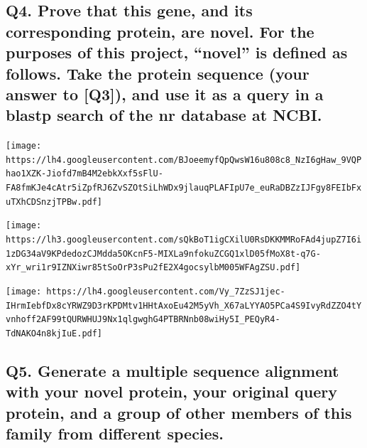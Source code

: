 \documentclass[
  letterpaper,
  DIV=11,
  numbers=noendperiod]{scrartcl}
\begin{document}
\hypertarget{q4.-prove-that-this-gene-and-its-corresponding-protein-are-novel.-for-the-purposes-of-this-project-novel-is-defined-as-follows.-take-the-protein-sequence-your-answer-to-q3-and-use-it-as-a-query-in-a-blastp-search-of-the-nr-database-at-ncbi.}{%
\subsection{\texorpdfstring{Q4. \textbf{Prove that this gene, and its
corresponding protein, are novel. For the purposes of this project,
``novel'' is defined as follows. Take the protein sequence (your answer
to {[}Q3{]}), and use it as a query in a blastp search of the nr
database at
NCBI.}}{Q4. Prove that this gene, and its corresponding protein, are novel. For the purposes of this project, ``novel'' is defined as follows. Take the protein sequence (your answer to {[}Q3{]}), and use it as a query in a blastp search of the nr database at NCBI.}}\label{q4.-prove-that-this-gene-and-its-corresponding-protein-are-novel.-for-the-purposes-of-this-project-novel-is-defined-as-follows.-take-the-protein-sequence-your-answer-to-q3-and-use-it-as-a-query-in-a-blastp-search-of-the-nr-database-at-ncbi.}}

\texttt{[image: https://lh4.googleusercontent.com/BJoeemyfQpQwsW16u808c8\_NzI6gHaw\_9VQPhao1XZK-Jiofd7mB4M2ebkXxf5sFlU-FA8fmKJe4cAtr5iZpfRJ6ZvSZOtSiLhWDx9jlauqPLAFIpU7e\_euRaDBZzIJFgy8FEIbFxuTXhCDSnzjTPBw.pdf]}

\texttt{[image: https://lh3.googleusercontent.com/sQkBoT1igCXilU0RsDKKMMRoFAd4jupZ7I6i1zDG34aV9KPdedozCJMdda5OKcnF5-MIXLa9nfokuZCGQ1xlD05fMoX8t-q7G-xYr\_wri1r9IZNXiwr85tSoOrP3sPu2fE2X4gocsylbM005WFAgZSU.pdf]}

\texttt{[image: https://lh4.googleusercontent.com/Vy\_7ZzSJ1jec-IHrmIebfDx8cYRWZ9D3rKPDMtv1HHtAxoEu42M5yVh\_X67aLYYAO5PCa4S9IvyRdZZO4tYvnhoff2AF99tQURWHUJ9Nx1qlgwghG4PTBRNnb08wiHy5I\_PEQyR4-TdNAKO4n8kjIuE.pdf]}

\hypertarget{q5.-generate-a-multiple-sequence-alignment-with-your-novel-protein-your-original-query-protein-and-a-group-of-other-members-of-this-family-from-different-species.}{%
\subsection{\texorpdfstring{Q5. \textbf{Generate a multiple sequence
alignment with your novel protein, your original query protein, and a
group of other members of this family from different
species.}}{Q5. Generate a multiple sequence alignment with your novel protein, your original query protein, and a group of other members of this family from different species.}}\label{q5.-generate-a-multiple-sequence-alignment-with-your-novel-protein-your-original-query-protein-and-a-group-of-other-members-of-this-family-from-different-species.}}
\end{document}
